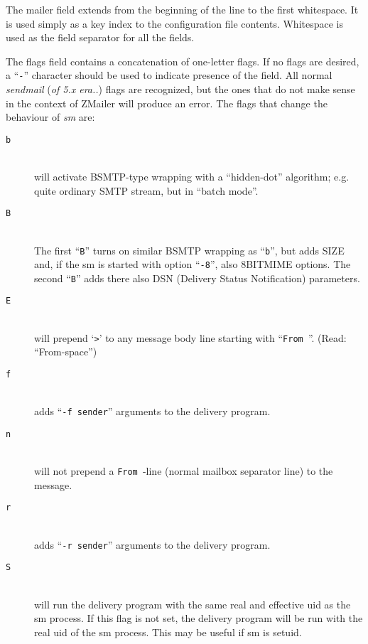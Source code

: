 The mailer field extends from the beginning of the line to
the first whitespace.  It is used simply as a key index to
the configuration  file  contents.  Whitespace is used as
the field separator for all the fields.

The flags field contains  a  concatenation  of  one-letter
flags.  If no flags are desired, a ``{\tt -}'' character should be
used to indicate presence of the field.
All normal {\em sendmail} ({\em of 5.x era..}) flags are recognized, but the ones that
do not make sense in the context of ZMailer will produce an error.
The flags that change the behaviour of {\em sm} are:

\begin{description}
\item[ {\tt b}] \mbox{} \\
will activate BSMTP-type wrapping with a ``hidden-dot''
algorithm; e.g. quite ordinary SMTP stream, but in ``batch mode''.

\item[ {\tt B}] \mbox{} \\
The  first ``{\tt B}''  turns on similar BSMTP wrapping as
``{\tt b}'', but adds SIZE and, if the sm is  started  with
option ``{\tt -8}'', also 8BITMIME options.  The second ``{\tt B}''
adds there also DSN (Delivery Status  Notification) parameters.

\item[ {\tt E}] \mbox{} \\
will prepend `\verb/>/' to any message body line starting
with ``\verb*/From /''. (Read: ``From-space'')

\item[ {\tt f}] \mbox{} \\
adds ``{\tt -f sender}'' arguments to the delivery program.

\item[ {\tt n}] \mbox{} \\
will not prepend a \verb*/From /-line (normal mailbox
separator line) to the message.

\item[ {\tt r}] \mbox{} \\
adds ``{\tt -r sender}'' arguments to the delivery program.

\item[ {\tt S}] \mbox{} \\
will run the delivery program with the same real
and effective uid as the sm process.  If this  flag
is  not  set, the delivery program will be run with
the real uid of the sm process. This may be useful if sm is setuid.


\end{description}
